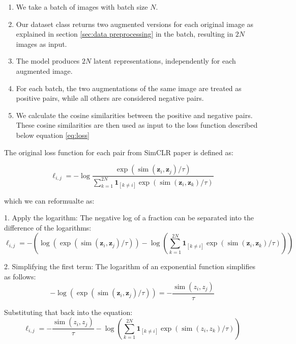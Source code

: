 \begin{enumerate}
    \item We take a batch of images with batch size $N$.
    
    \item Our dataset class returns two augmented versions for each original image as explained in section \ref{sec:data preprocessing} in the batch, 
    resulting in $2N$ images as input.

    \item The model produces $2N$ latent representations, independently for each augmented image.

    \item For each batch, the two augmentations of the same image are treated as positive pairs, while all others are considered negative pairs.

    \item We calculate the cosine similarities between the positive and negative pairs. These cosine similarities are then used as input to the loss
     function described below equation \ref{eq:loss}
\end{enumerate}
The original loss function for each pair from SimCLR paper \cite{chen2020simple} is defined as:

\begin{equation}
\ell_{i, j} = -\log \frac{\exp \left(\operatorname{sim}\left(\boldsymbol{z}_i, \boldsymbol{z}_j\right) / \tau\right)}{\sum_{k=1}^{2 N} \mathbf{1}_{[k \neq i]} \exp \left(\operatorname{sim}\left(\boldsymbol{z}_i, \boldsymbol{z}_k\right) / \tau\right)}
\label{eq:original}
\end{equation}
  
which we can reformualte as:

1. Apply the logarithm: The negative log of a fraction can be separated into the difference of the logarithms:
\[
\ell_{i, j} = -\left( \log \left(\exp \left(\operatorname{sim}\left(\boldsymbol{z}_i, \boldsymbol{z}_j\right) / \tau\right)\right) - \log\left( \sum_{k=1}^{2 N} \mathbf{1}_{[k \neq i]} \exp \left(\operatorname{sim}\left(\boldsymbol{z}_i, \boldsymbol{z}_k\right) / \tau\right) \right) \right)
\]

2. Simplifying the first term: The logarithm of an exponential function simplifies as follows:
\[
-\log\left(\exp\left(\operatorname{sim}\left(\boldsymbol{z}_i, \boldsymbol{z}_j\right) / \tau\right)\right) = -\frac{\operatorname{sim}\left(z_{i}, z_{j}\right)}{\tau}
\]

Substituting that back into the equation:
\[
\ell_{i, j} = -\frac{\operatorname{sim}\left(z_{i}, z_{j}\right)}{\tau} - \log\left(\sum_{k=1}^{2 N} \mathbf{1}_{[k \neq i]} \exp\left(\operatorname{sim}\left(z_{i}, z_{k}\right) / \tau\right)\right)
\]

